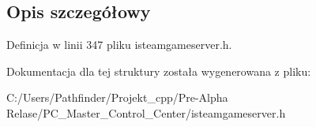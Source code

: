 \subsection{Opis szczegółowy}


Definicja w linii 347 pliku isteamgameserver.\+h.



Dokumentacja dla tej struktury została wygenerowana z pliku\+:\begin{DoxyCompactItemize}
\item 
C\+:/\+Users/\+Pathfinder/\+Projekt\+\_\+cpp/\+Pre-\/\+Alpha Relase/\+P\+C\+\_\+\+Master\+\_\+\+Control\+\_\+\+Center/isteamgameserver.\+h\end{DoxyCompactItemize}
